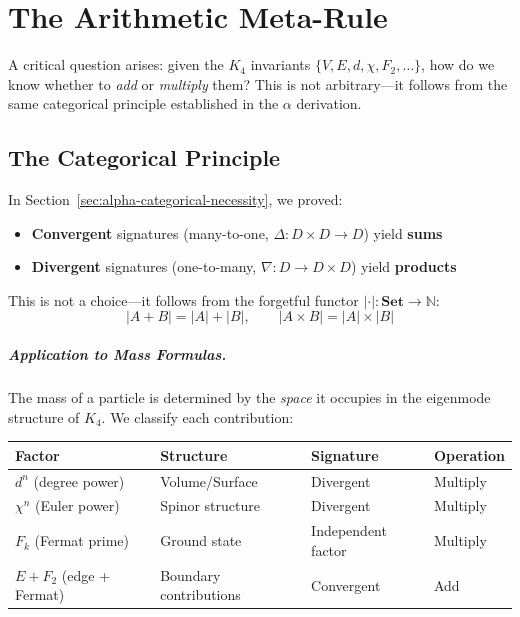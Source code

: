 \documentclass[11pt,a4paper]{book}
\begin{document}
\chapter{The Arithmetic Meta-Rule}
\label{chap:arithmetic-meta-rule}

A critical question arises: given the $K_4$ invariants $\{V, E, d, \chi, F_2, \ldots\}$, 
how do we know whether to \emph{add} or \emph{multiply} them? This is not arbitrary---it 
follows from the same categorical principle established in the $\alpha$ derivation.

\section{The Categorical Principle}

In Section~\ref{sec:alpha-categorical-necessity}, we proved:
\begin{itemize}
\item \textbf{Convergent} signatures (many-to-one, $\Delta : D \times D \to D$) yield \textbf{sums}
\item \textbf{Divergent} signatures (one-to-many, $\nabla : D \to D \times D$) yield \textbf{products}
\end{itemize}

This is not a choice---it follows from the forgetful functor $|\cdot| : \mathbf{Set} \to \mathbb{N}$:
\[
|A + B| = |A| + |B|, \qquad |A \times B| = |A| \times |B|
\]

\paragraph{Application to Mass Formulas.}

The mass of a particle is determined by the \emph{space} it occupies in the eigenmode 
structure of $K_4$. We classify each contribution:

\begin{center}
\begin{tabular}{llll}
\textbf{Factor} & \textbf{Structure} & \textbf{Signature} & \textbf{Operation} \\
\hline
$d^n$ (degree power) & Volume/Surface & Divergent & Multiply \\
$\chi^n$ (Euler power) & Spinor structure & Divergent & Multiply \\
$F_k$ (Fermat prime) & Ground state & Independent factor & Multiply \\
$E + F_2$ (edge + Fermat) & Boundary contributions & Convergent & Add \\
\end{tabular}
\end{center}
\end{document}
